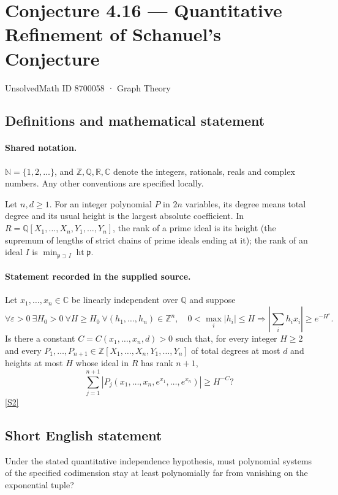 \documentclass[11pt]{article}
\newcommand{\sref}[2]{\hyperlink{source:#1:#2}{[S#2]}}
\begin{document}
\setcounter{section}{8700057}
\section{Conjecture 4.16 — Quantitative Refinement of Schanuel's Conjecture}\label{8700058}
{\small\sffamily UnsolvedMath ID 8700058 · Graph Theory}
\subsection{Definitions and mathematical statement}

\paragraph{Shared notation.}$\mathbb N=\{1,2,\ldots\}$, and $\mathbb Z,\mathbb Q,\mathbb R,\mathbb C$ denote the integers, rationals, reals and complex numbers. Any other conventions are specified locally.


Let $n,d\ge1$. For an integer polynomial $P$ in $2n$ variables, its degree means total degree and its usual height is the largest absolute coefficient. In $R=\mathbb Q[X_1,\ldots,X_n,Y_1,\ldots,Y_n]$, the rank of a prime ideal is its height (the supremum of lengths of strict chains of prime ideals ending at it); the rank of an ideal $I$ is $\min_{\mathfrak p\supset I}\operatorname{ht}\mathfrak p$.
\paragraph{Statement recorded in the supplied source.}
Let $x_1,\ldots,x_n\in\mathbb C$ be linearly independent over $\mathbb Q$ and suppose
\[
\forall\varepsilon>0\ \exists H_0>0\ \forall H\ge H_0\ \forall(h_1,\ldots,h_n)\in\mathbb Z^n,
\quad 0<\max_i|h_i|\le H\Longrightarrow
\left|\sum_i h_ix_i\right|\ge e^{-H^{\varepsilon}}.
\]
Is there a constant $C=C(x_1,\ldots,x_n,d)>0$ such that, for every integer $H\ge2$ and every $P_1,\ldots,P_{n+1}\in\mathbb Z[X_1,\ldots,X_n,Y_1,\ldots,Y_n]$ of total degrees at most $d$ and heights at most $H$ whose ideal in $R$ has rank $n+1$,
\[
\sum_{j=1}^{n+1}|P_j(x_1,\ldots,x_n,e^{x_1},\ldots,e^{x_n})|\ge H^{-C}?
\] \sref{8700058}{2}

\subsection{Short English statement}
Under the stated quantitative independence hypothesis, must polynomial systems of the specified codimension stay at least polynomially far from vanishing on the exponential tuple?
\end{document}
